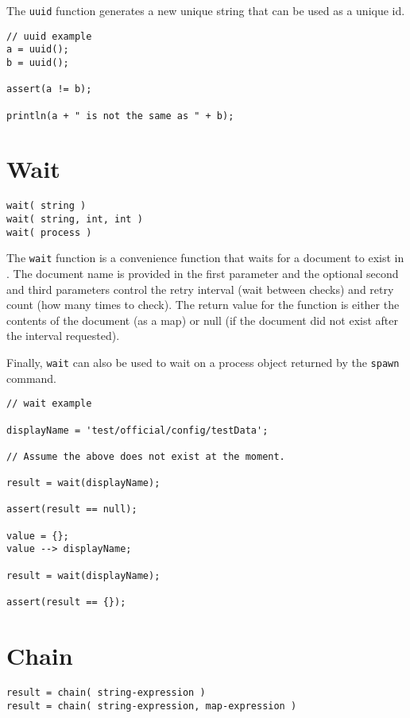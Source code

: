 The \Verb+uuid+ function generates a new unique string that can be used as a unique id.

\begin{lstlisting}[caption={UUID example}]
// uuid example
a = uuid();
b = uuid();

assert(a != b);

println(a + " is not the same as " + b);

\end{lstlisting}

\section{Wait}

\begin{Verbatim}
wait( string )
wait( string, int, int )
wait( process )
\end{Verbatim}

The \Verb+wait+ function is a convenience function that waits for a document to exist in \Rapture. The document name is provided in the first parameter and the optional second and third parameters control the retry interval (wait between checks) and retry count (how many times to check). The return value for the function is either the contents of the document (as a map) or null (if the document did not exist after the interval requested).

Finally, \Verb+wait+ can also be used to wait on a process object returned by the \verb+spawn+ command.

\begin{lstlisting}[caption={Wait example}]
// wait example

displayName = 'test/official/config/testData';

// Assume the above does not exist at the moment.

result = wait(displayName);

assert(result == null);

value = {};
value --> displayName;

result = wait(displayName);

assert(result == {});
\end{lstlisting}

\section{Chain}

\begin{Verbatim}
result = chain( string-expression )
result = chain( string-expression, map-expression )
\end{Verbatim}

